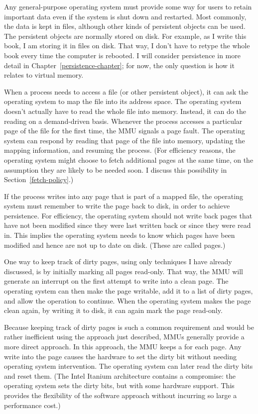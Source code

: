 Any general-purpose operating system must provide some way for users
to retain important data even if the system is shut down and
restarted.  Most commonly, the data is kept in files, although other
kinds of persistent objects can be used.  The persistent objects are
normally stored on disk. For example, as I write this book, I am
storing it in files on disk.  That way, I don't have to retype the
whole book every time the computer is rebooted.  I will consider
persistence in more detail in Chapter~\ref{persistence-chapter}; for
now, the only question is how it relates to virtual memory.

When a process needs to access a file (or other persistent object),
it can ask the operating system to map the file into its address
space.  The operating system doesn't actually have to read the whole
file into memory.  Instead, it can do the reading on a demand-driven
basis.  Whenever the process accesses a particular page of the file
for the first time, the MMU signals a page fault.  The operating
system can respond by reading that page of the file into memory,
updating the mapping information, and resuming the process. (For
efficiency reasons, the operating system might choose to fetch
additional pages at the same time, on the assumption they are likely
to be needed soon.  I discuss this possibility in Section~\ref{fetch-policy}.)

If the process writes into any page that
is part of a mapped file, the operating system must remember to write
the page back to disk, in order to achieve persistence.  For efficiency, the
operating system should not write back pages that have not been
modified since they were last written back or since they were read in.
This implies the operating system needs to know which pages have been
modified and hence are not up to date on disk.  (These are called
 pages.)

One way to keep track of dirty pages, using only techniques I have
already discussed, is by initially marking all pages read-only.  That
way, the MMU will generate an interrupt on the first attempt to write
into a clean page.  The operating system can then make the page
writable, add it to a list of dirty pages, and allow the operation to
continue.  When the operating system makes the page clean again, by
writing it to disk, it can again mark the page read-only.

Because keeping track of dirty pages is such a common requirement and
would be rather inefficient using the approach just described, MMUs
generally provide a more direct approach.  In this approach, the MMU keeps a
 for each page.  Any write into the page causes the
hardware to set the dirty bit without needing operating system
intervention.  The operating system can later read the dirty bits and
reset them.  (The Intel Itanium architecture contains a compromise:
the operating system sets the dirty bits, but with some hardware
support.  This provides the flexibility of the software approach
without incurring so large a performance cost.)


